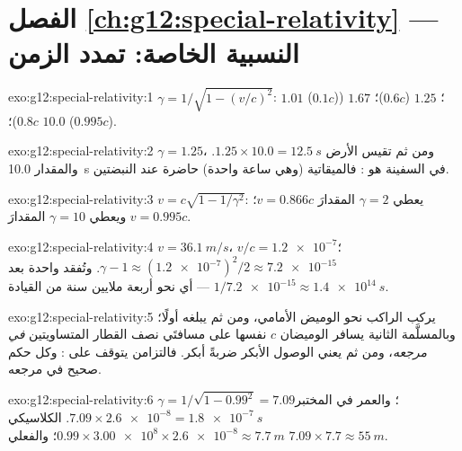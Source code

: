 \section*{الفصل \ref{ch:g12:special-relativity} --- النسبية الخاصة: تمدد الزمن}

\begin{solution}{exo:g12:special-relativity:1}
$\gamma = 1/\sqrt{1 - (v/c)^2}$: $1.01$ ($0.1c$)؛ $1.25$ ($0.6c$)؛
$1.67$ ($0.8c$)؛ $10.0$ ($0.995c$).
\end{solution}

\begin{solution}{exo:g12:special-relativity:2}
$\gamma = 1.25$، ومن ثم تقيس الأرض $1.25 \times 10.0 =
\qty{12.5}{s}$. والمقدار \qty{10.0}{s} في السفينة هو :
فالميقاتية (وهي ساعة واحدة) حاضرة عند النبضتين.
\end{solution}

\begin{solution}{exo:g12:special-relativity:3}
$v = c\sqrt{1 - 1/\gamma^2}$: يعطي $\gamma = 2$ المقدارَ $v = 0.866c$؛
ويعطي $\gamma = 10$ المقدارَ $v = 0.995c$.
\end{solution}

\begin{solution}{exo:g12:special-relativity:4}
$v = \qty{36.1}{m/s}$، $v/c = \num{1.2e-7}$؛
$\gamma - 1 \approx (\num{1.2e-7})^2/2 \approx \num{7.2e-15}$. وتُفقد 
واحدة بعد $1/\num{7.2e-15} \approx \qty{1.4e14}{s}$ --- أي نحو
أربعة ملايين سنة من القيادة.
\end{solution}

\begin{solution}{exo:g12:special-relativity:5}
يركب الراكب نحو الوميض الأمامي، ومن ثم يبلغه أولًا؛
وبالمسلَّمة الثانية يسافر الوميضان  $c$ نفسها على مسافتَي نصف القطار
المتساويتين \emph{في مرجعه}، ومن ثم يعني الوصول الأبكر
ضربةً أبكر. فالتزامن يتوقف على : وكل حكم
صحيح في مرجعه.
\end{solution}

\begin{solution}{exo:g12:special-relativity:6}
$\gamma = 1/\sqrt{1 - 0.99^2} = 7.09$؛ والعمر في المختبر
$7.09 \times \num{2.6e-8} = \qty{1.8e-7}{s}$.  الكلاسيكي
$0.99 \times \num{3.00e8} \times \num{2.6e-8} \approx \qty{7.7}{m}$؛
والفعلي $7.09 \times 7.7 \approx \qty{55}{m}$.
\end{solution}

